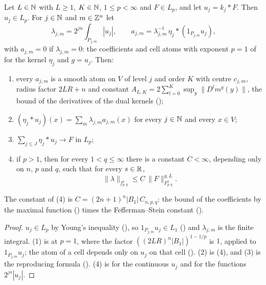 \begin{theorem}
\label{thm:tl-atomic-decomposition}
\leanok
{}
Let $L \in \mathbb{N}$ with $L \geq 1$, $K \in \mathbb{N}$, $1 \leq p < \infty$ and $F \in L_p$, and let
$u_j = k_j * F$. Then $u_j \in L_p$. For $j \in \mathbb{N}$ and $m \in \mathbb{Z}^n$ let
\[
  \lambda_{j,m} = 2^{jn} \int_{P_{j,m}} |u_j| , \qquad
  a_{j,m} = \lambda_{j,m}^{-1} \, \eta_j * (1_{P_{j,m}} u_j) ,
\]
with $a_{j,m} = 0$ if $\lambda_{j,m} = 0$: the coefficients and cell atoms with exponent $p = 1$
of  for the kernel $\eta_j$ and $g = u_j$. Then:
\begin{enumerate}
  \item every $a_{j,m}$ is a smooth atom on $V$ of level $j$ and order $K$ with centre $c_{j,m}$,
    radius factor $2LR + n$ and constant $A_{L,K} = 2 \sum_{l=0}^K \sup_y \|D^l m^g(y)\|$, the
    bound of the derivatives of the dual kernels ();
  \item $(\eta_j * u_j)(x) = \sum_m \lambda_{j,m} a_{j,m}(x)$ for every $j \in \mathbb{N}$ and every
    $x \in V$;
  \item $\sum_{j \leq J} \eta_j * u_j \to F$ in $L_p$;
  \item if $p > 1$, then for every $1 < q \leq \infty$ there is a constant $C < \infty$,
    depending only on $n$, $p$ and $q$, such that for every $s \in \mathbb{R}$,
    \[
      \|\lambda\|_{f^s_{p,q}} \leq C \, \|F\|^{g,L}_{F^s_{p,q}} .
    \]
\end{enumerate}
\end{theorem}

The constant of (4) is $C = (2n + 1)^n |B_1| \, C_{n,p,q}$: the bound of the coefficients by the
maximal function () times the Fefferman--Stein constant
().

\begin{proof}
\leanok
$u_j \in L_p$ by Young's inequality (), so $1_{P_{j,m}} u_j \in L_1$
() and $\lambda_{j,m}$ is the finite integral. (1) is
 at $p = 1$, where the factor $((2LR)^n |B_1|)^{1 - 1/p}$ is $1$,
applied to $1_{P_{j,m}} u_j$; the atom of a cell depends only on $u_j$ on that cell
(). (2) is  (4), and (3) is the reproducing
formula (). (4) is  for
the continuous $u_j$ and  for the functions $2^{js} |u_j|$.
\end{proof}


